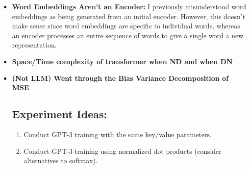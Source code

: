 \documentclass{article}
\begin{document}
\begin{itemize}
\item \textbf{Word Embeddings Aren’t an Encoder:}
I previously misunderstood word embeddings as being generated from an initial encoder. However, this doesn't make sense since word embeddings are specific to individual words, whereas an encoder processes an entire sequence of words to give a single word a new representation.

 \item \textbf{Space/Time complexity of transformer when N\>D and when D\>N}
  \item \textbf{(Not LLM) Went through the Bias Variance Decomposition of MSE}

\subsection*{Experiment Ideas:}
\begin{enumerate}
  \item Conduct GPT-3 training with the same key/value parameters.
  \item Conduct GPT-3 training using normalized dot products (consider alternatives to softmax).
\end{enumerate}

\end{itemize}
\end{document}
